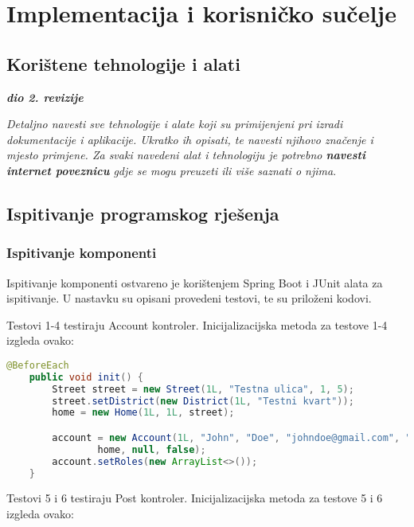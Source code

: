 \chapter{Implementacija i korisničko sučelje}
		
		
		\section{Korištene tehnologije i alati}
		
			\textbf{\textit{dio 2. revizije}}
			
			 \textit{Detaljno navesti sve tehnologije i alate koji su primijenjeni pri izradi dokumentacije i aplikacije. Ukratko ih opisati, te navesti njihovo značenje i mjesto primjene. Za svaki navedeni alat i tehnologiju je potrebno \textbf{navesti internet poveznicu} gdje se mogu preuzeti ili više saznati o njima}.
			
			
			\eject 
		
	
		\section{Ispitivanje programskog rješenja}
					
			\subsection{Ispitivanje komponenti}

			Ispitivanje komponenti ostvareno je korištenjem Spring Boot i JUnit alata za ispitivanje.
			U nastavku su opisani provedeni testovi, te su priloženi kodovi.

			Testovi 1-4 testiraju Account kontroler.
			Inicijalizacijska metoda za testove 1-4 izgleda ovako:

			\begin{lstlisting}[language=Java, breaklines=true]
    @BeforeEach
    public void init() {
        Street street = new Street(1L, "Testna ulica", 1, 5);
        street.setDistrict(new District(1L, "Testni kvart"));
        home = new Home(1L, 1L, street);

        account = new Account(1L, "John", "Doe", "johndoe@gmail.com", "pass123",
                home, null, false);
        account.setRoles(new ArrayList<>());
    }
			\end{lstlisting}

			Testovi 5 i 6 testiraju Post kontroler.
			Inicijalizacijska metoda za testove 5 i 6 izgleda ovako:

